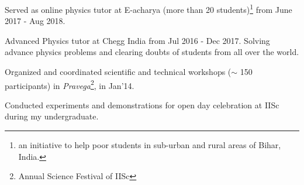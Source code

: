 \documentclass[12pt,letterpaper]{article}
\begin{document}
\begin{list}{}{\cvlist}
  \item Served as online physics tutor at E-acharya (more than 20 students)\footnote{an initiative to help poor students in sub-urban and rural areas of Bihar, India.} from June 2017 - Aug 2018.
    \item Advanced Physics tutor at Chegg India from Jul 2016 - Dec 2017. Solving advance physics problems and clearing doubts of students from all over the world.
  \item Organized and coordinated scientific and technical workshops ($\sim$ 150 participants) in \emph{Pravega}\footnote{Annual Science Festival of IISc}, in Jan'14.
    \item Conducted experiments and demonstrations for open day celebration at IISc during my undergraduate.
\end{list}
\end{document}
